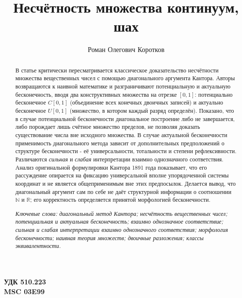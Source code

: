 \documentclass[12pt]{article}
\title{Несчётность множества континуум, шах}
\author{Роман Олегович Коротков}
\begin{document}

\begin{flushleft}
{\bf УДК 510.223 }\\{\bf MSC 03E99 }
\end{flushleft}

{\let\newpage\relax\maketitle}

\begin{abstract}

В статье критически пересматривается классическое доказательство несчётности множества вещественных чисел с помощью диагонального аргумента Кантора. Авторы возвращаются к наивной математике и разграничивают потенциальную и актуальную бесконечность, вводя два конструктивных множества на отрезке $[0, 1]$: потенциально бесконечное $C[0, 1]$ (объединение всех конечных двоичных записей) и актуально бесконечное $U[0, 1]$ (множество, в котором каждый разряд определён). Показано, что в случае потенциальной бесконечности диагональное построение либо не завершается, либо порождает лишь счётное множество пределов, не позволяя доказать существование числа вне исходного множества. В случае актуальной бесконечности применимость диагонального метода зависит от дополнительных предположений о структуре бесконечности - её универсальности, тотальности и степени рефлексивности. Различаются {\it сильная} и {\it слабая} интерпретации взаимно однозначного соответствия. Анализ оригинальной формулировки Кантора 1891 года показывает, что его рассуждение опирается на фиксацию универсальной вполне упорядоченной системы координат и не является общеприменимым вне этих предпосылок. Делается вывод, что диагональный аргумент сам по себе не даёт структурной информации о соотношении $\mathbb{N}$ и $\mathbb{R}$; его корректность определяется принятой морфологией бесконечности.

{\it Ключевые слова: диагональный метод Кантора; несчётность вещественных чисел; потенциальная и актуальная бесконечность; взаимно однозначное соответствие; сильная и слабая интерпретации взаимно однозначного соответствия; морфология бесконечности; наивная теория множеств; двоичные разложения; классы эквивалентности.}

\end{abstract}

\end{document}

